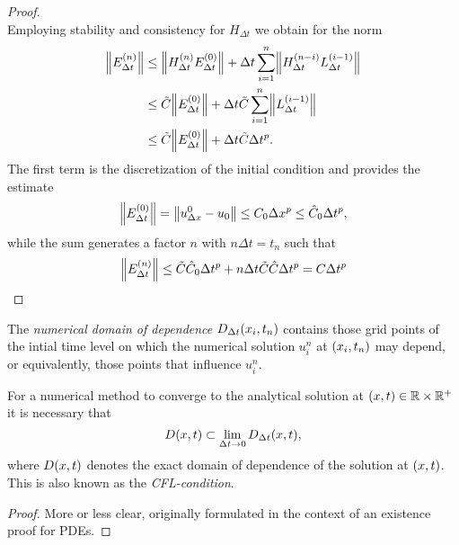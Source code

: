 \begin{proof}
\[	\]
	Employing stability and consistency for \(H_{\Delta t}\) we obtain for the norm
	\begin{align*}
		\norm*{E_{\Delta t}^{\parentheses*{n}}} &\le \norm*{H_{\Delta t}^{\parentheses*{n}}E_{\Delta t}^{\parentheses*{0}}} + \Delta t\sum_{i = 1}^n \norm*{H_{\Delta t}^{\parentheses*{n - i}}L_{\Delta t}^{\parentheses*{i - 1}}}\\
		&\le \tilde{C}\norm*{E_{\Delta t}^{\parentheses*{0}}} + \Delta t\tilde{C}\sum_{i = 1}^n \norm*{L_{\Delta t}^{\parentheses*{i - 1}}}\\
		&\le \tilde{C}\norm*{E_{\Delta t}^{\parentheses*{0}}} + \Delta t\tilde{C}\Delta t^p.
	\end{align*}
	The first term is the discretization of the initial condition and provides the estimate
	\[
		\norm*{E_{\Delta t}^{\parentheses*{0}}} = \norm*{u_{\Delta x}^0 - u_0} \le C_0 \Delta x^p \le \hat{C}_0 \Delta t^p,
	\]
	while the sum generates a factor \(n\) with \(n\Delta t = t_n\) such that
	\[
		\norm*{E_{\Delta t}^{\parentheses*{n}}} \le \tilde{C}\hat{C}_0 \Delta t^p + n\Delta t\tilde{C}\hat{C}\Delta t^p = C\Delta t^p
	\]
\end{proof}

\begin{definition}
	The \emph{numerical domain of dependence} \(D_{\Delta t}\parentheses*{x_i, t_n}\) contains those grid points of the intial time level on which the numerical solution \(u_i^n\) at \(\parentheses*{x_i, t_n}\) may depend, or equivalently, those points that influence \(u_i^n\).
\end{definition}

\begin{theorem}
	For a numerical method to converge to the analytical solution at \(\parentheses*{x, t} \in \R \times \R^+\) it is necessary that
	\[
		D\parentheses*{x, t} \subset \lim_{\Delta t \to 0}D_{\Delta t}\parentheses*{x, t},
	\]
	where \(D\parentheses*{x, t}\) denotes the exact domain of dependence of the solution at \(\parentheses*{x, t}\).
	This is also known as the \emph{CFL-condition}.
\end{theorem}

\begin{proof}
	More or less clear, originally formulated in the context of an existence proof for PDEs.
\end{proof}

